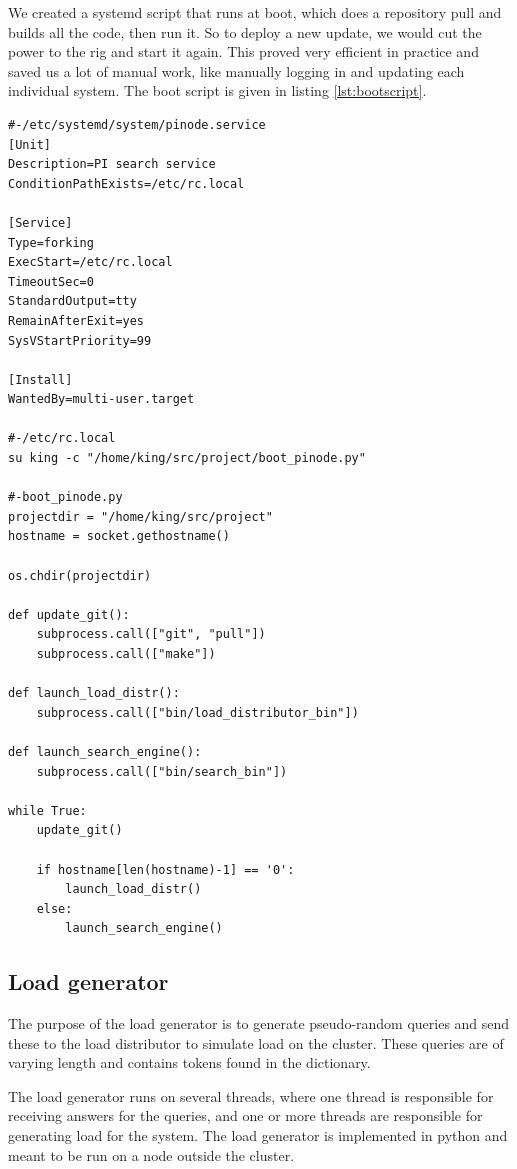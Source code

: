 We created a systemd script that runs at boot, which does a repository pull and builds all the code, then run it. So to deploy a new update, we would cut the power to the rig and start it again.
This proved very efficient in practice and saved us a lot of manual work, like manually logging in and updating each individual system. The boot script is given in listing \ref{lst:bootscript}.
\begin{lstlisting}[captionpos=b,caption={Our Systemd boot script. It launches a script that makes sure datetime is set before launching the update script.},label={lst:bootscript}]
#-/etc/systemd/system/pinode.service
[Unit]
Description=PI search service
ConditionPathExists=/etc/rc.local

[Service]
Type=forking
ExecStart=/etc/rc.local
TimeoutSec=0
StandardOutput=tty
RemainAfterExit=yes
SysVStartPriority=99

[Install]
WantedBy=multi-user.target

#-/etc/rc.local
su king -c "/home/king/src/project/boot_pinode.py"

#-boot_pinode.py
projectdir = "/home/king/src/project"
hostname = socket.gethostname()

os.chdir(projectdir)

def update_git():
    subprocess.call(["git", "pull"])
    subprocess.call(["make"])

def launch_load_distr():
    subprocess.call(["bin/load_distributor_bin"])

def launch_search_engine():
    subprocess.call(["bin/search_bin"])

while True:
    update_git()

    if hostname[len(hostname)-1] == '0':
        launch_load_distr()
    else:
        launch_search_engine()

\end{lstlisting}

\subsection{Load generator}
The purpose of the load generator is to generate pseudo-random queries and send these to the load distributor to simulate load on the cluster. These queries are of varying length and contains tokens found in the dictionary.

The load generator runs on several threads, where one thread is responsible for receiving answers for the queries, and one or more threads are responsible for generating load for the system. The load generator is implemented in python and meant to be run on a node outside the cluster.

